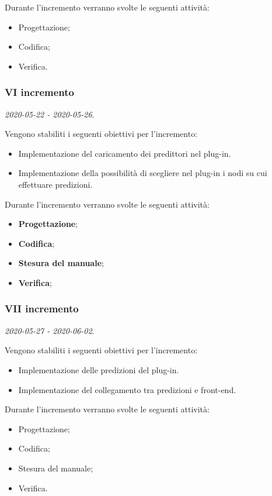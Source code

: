\documentclass[../piano-di-progetto.tex]{subfiles}
\begin{document}
Durante l'incremento verranno svolte le seguenti attività: 
\begin{itemize}
    \item Progettazione;
    \item Codifica;
    \item Verifica.
\end{itemize}

\subsubsection{VI incremento}
\emph{2020-05-22 - 2020-05-26}. 
 
 Vengono stabiliti i seguenti obiettivi per l'incremento:
 \begin{itemize}
     \item Implementazione del caricamento dei predittori nel plug-in.
     \item Implementazione della possibilità di scegliere nel plug-in i nodi su cui effettuare predizioni.
 \end{itemize}

Durante l'incremento verranno svolte le seguenti attività: 
\begin{itemize}
    \item \textbf{Progettazione};
    \item \textbf{Codifica};
    \item \textbf{Stesura del manuale};
    \item \textbf{Verifica};
\end{itemize}

\subsubsection{VII incremento}
\emph{2020-05-27 - 2020-06-02}. 
 
 Vengono stabiliti i seguenti obiettivi per l'incremento:
 \begin{itemize}
    \item Implementazione delle predizioni del plug-in.
    \item Implementazione del collegamento tra predizioni e front-end.

\end{itemize}

Durante l'incremento verranno svolte le seguenti attività: 
\begin{itemize}
    \item Progettazione;
    \item Codifica;
    \item Stesura del manuale;
    \item Verifica.
\end{itemize}
\end{document}

